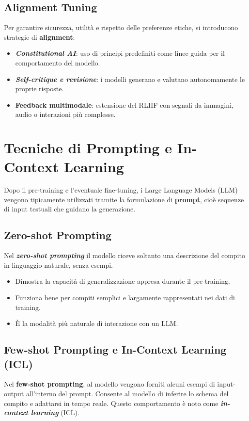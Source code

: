 \subsection{Alignment Tuning}
Per garantire sicurezza, utilità e rispetto delle preferenze etiche, 
si introducono strategie di \textbf{alignment}:
\begin{itemize}
    \item \textbf{\textit{Constitutional AI}}: uso di principi predefiniti come linee guida per il comportamento del modello.
    \item \textbf{\textit{Self-critique e revisione}}: i modelli generano e valutano autonomamente le proprie risposte.
    \item \textbf{Feedback multimodale}: estensione del RLHF con segnali da immagini, audio o interazioni più complesse.
\end{itemize}

\newpage
\section{Tecniche di Prompting e In-Context Learning}

Dopo il pre-training e l'eventuale fine-tuning, i Large Language Models (LLM) 
vengono tipicamente utilizzati tramite la formulazione di \textbf{prompt}, cioè sequenze di input testuali che guidano la generazione.

\subsection{Zero-shot Prompting}
Nel \textbf{\textit{zero-shot prompting}} il modello riceve soltanto una descrizione del compito 
in linguaggio naturale, senza esempi.
\begin{itemize}
    \item Dimostra la capacità di generalizzazione appresa durante il pre-training.
    \item Funziona bene per compiti semplici e largamente rappresentati nei dati di training.
    \item È la modalità più naturale di interazione con un LLM.
\end{itemize}

\subsection{Few-shot Prompting e In-Context Learning (ICL)}
Nel \textbf{few-shot prompting}, al modello vengono forniti alcuni esempi 
di input-output all'interno del prompt. Consente al modello di inferire lo schema del compito e adattarsi in tempo reale.
Questo comportamento è noto come \textbf{\textit{in-context learning}} (ICL).

